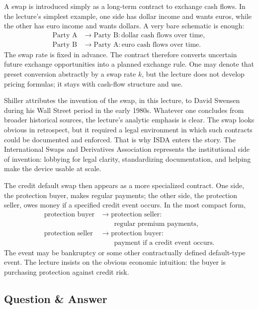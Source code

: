 A swap is introduced simply as a long-term contract to exchange cash flows. In the lecture's simplest example, one side has dollar income and wants euros, while the other has euro income and wants dollars. A very bare schematic is enough:
\begin{align}
\text{Party A} &\rightarrow \text{Party B}: \text{dollar cash flows over time},\\
\text{Party B} &\rightarrow \text{Party A}: \text{euro cash flows over time}.
\end{align}
The swap rate is fixed in advance. The contract therefore converts uncertain future exchange opportunities into a planned exchange rule. One may denote that preset conversion abstractly by a swap rate $k$, but the lecture does not develop pricing formulas; it stays with cash-flow structure and use.

Shiller attributes the invention of the swap, in this lecture, to David Swensen during his Wall Street period in the early 1980s. Whatever one concludes from broader historical sources, the lecture's analytic emphasis is clear. The swap looks obvious in retrospect, but it required a legal environment in which such contracts could be documented and enforced. That is why ISDA enters the story. The International Swaps and Derivatives Association represents the institutional side of invention: lobbying for legal clarity, standardizing documentation, and helping make the device usable at scale.

The credit default swap then appears as a more specialized contract. One side, the protection buyer, makes regular payments; the other side, the protection seller, owes money if a specified credit event occurs. In the most compact form,
\begin{align}
\text{protection buyer} &\rightarrow \text{protection seller}: \\
&\qquad \text{regular premium payments},\\
\text{protection seller} &\rightarrow \text{protection buyer}: \\
&\qquad \text{payment if a credit event occurs}.
\end{align}
The event may be bankruptcy or some other contractually defined default-type event. The lecture insists on the obvious economic intuition: the buyer is purchasing protection against credit risk.

\subsection{Question \& Answer}

